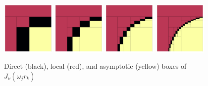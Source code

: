 \begin{figure}
    \centering
    \includegraphics[width=0.23\textwidth]{./figures/nufht_boxes_lvl1.pdf}
    \hfill
    \includegraphics[width=0.23\textwidth]{./figures/nufht_boxes_lvl2.pdf}
    \hfill
    \includegraphics[width=0.23\textwidth]{./figures/nufht_boxes_lvl3.pdf}
    \hfill
    \includegraphics[width=0.23\textwidth]{./figures/nufht_boxes_lvl4.pdf}
    \caption{Direct (black), local (red), and asymptotic (yellow) boxes of
    $J_\nu(\omega_j r_k)$}
  \end{figure}